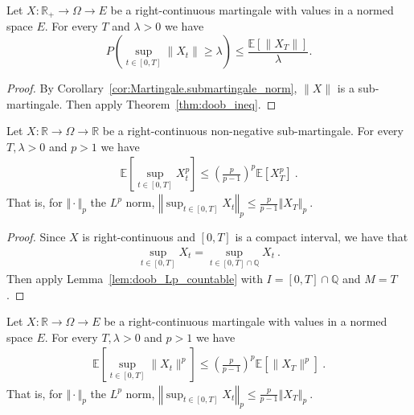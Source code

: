 \begin{corollary}\label{cor:doob_ineq_norm}
  \leanok
  Let $X:\mathbb{R}_+ \to \Omega \to E$ be a right-continuous martingale with values in a normed space $E$.
  For every $T$ and $\lambda>0$ we have
  $$
  P\left( \sup_{t\in[0,T]} \lVert X_t \rVert \geq \lambda \right)
  \leq \frac{\mathbb{E}[\lVert X_T \rVert]}{\lambda}.
  $$
\end{corollary}

\begin{proof}
  \leanok
  By Corollary~\ref{cor:Martingale.submartingale_norm}, $\lVert X \rVert$ is a sub-martingale.
  Then apply Theorem~\ref{thm:doob_ineq}.
\end{proof}


\begin{theorem}\label{thm:doob_lp}
  Let $X:\mathbb{R} \rightarrow \Omega \rightarrow \mathbb{R}$ be a right-continuous non-negative sub-martingale.
  For every $T, \lambda>0$ and $p>1$ we have
  \begin{align*}
    \mathbb{E}\left[ \sup_{t\in[0,T]}X_t^p \right]
    \leq \left(\frac{p}{p-1}\right)^p\mathbb{E}[X_T^p]
    \: .
  \end{align*}
  That is, for $\Vert \cdot \Vert_p$ the $L^p$ norm,
  $\left\Vert \sup_{t\in[0,T]}  X_t  \right\Vert_p
    \leq \frac{p}{p-1} \left\Vert X_T \right\Vert_p
    \: .$
\end{theorem}

\begin{proof}
Since $X$ is right-continuous and $[0,T]$ is a compact interval, we have that
\begin{align*}
  \sup_{t\in[0,T]}X_t = \sup_{t\in[0,T] \cap \mathbb{Q}}X_t
  \: .
\end{align*}
Then apply Lemma~\ref{lem:doob_Lp_countable} with $I = [0,T] \cap \mathbb{Q}$ and $M = T$.
\end{proof}


\begin{corollary}\label{cor:doob_lp_norm}
  Let $X : \mathbb{R} \rightarrow \Omega\rightarrow E$ be a right-continuous martingale with values in a normed space $E$.
  For every $T, \lambda>0$ and $p>1$ we have
  \begin{align*}
    \mathbb{E}\left[ \sup_{t\in[0,T]} \lVert X_t \rVert ^ p \right]
    \leq \left(\frac{p}{p-1}\right)^p\mathbb{E}[\lVert X_T \rVert ^p]
    \: .
  \end{align*}
  That is, for $\Vert \cdot \Vert_p$ the $L^p$ norm,
  $\left\Vert \sup_{t\in[0,T]}  X_t  \right\Vert_p
    \leq \frac{p}{p-1} \left\Vert X_T \right\Vert_p
    \: .$
\end{corollary}

